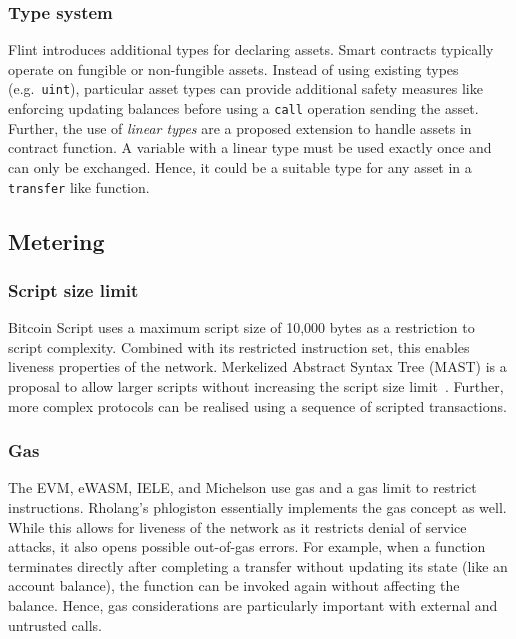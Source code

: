 \subsubsection{Type system}
Flint introduces additional types for declaring assets. Smart contracts typically operate on fungible or non-fungible assets. Instead of using existing types (e.g.\ \texttt{uint}), particular asset types can provide additional safety measures like enforcing updating balances before using a \texttt{call} operation sending the asset.
Further, the use of \emph{linear types} are a proposed extension to handle assets in contract function.
A variable with a linear type must be used exactly once and can only be exchanged.
Hence, it could be a suitable type for any asset in a \texttt{transfer} like function.



\subsection{Metering}

\subsubsection{Script size limit}
Bitcoin Script uses a maximum script size of 10,000 bytes as a restriction to script complexity. 
Combined with its restricted instruction set, this enables liveness properties of the network. 
Merkelized Abstract Syntax Tree (MAST) is a proposal to allow larger scripts without increasing the script size limit~\cite{Harding2017}.
Further, more complex protocols can be realised using a sequence of scripted transactions.

\subsubsection{Gas}
The EVM, eWASM, IELE, and Michelson use gas and a gas limit to restrict instructions. Rholang's phlogiston essentially implements the gas concept as well. While this allows for liveness of the network as it restricts denial of service attacks, it also opens possible out-of-gas errors. For example, when a function terminates directly after completing a transfer without updating its state (like an account balance), the function can be invoked again without affecting the balance.
Hence, gas considerations are particularly important with external and untrusted calls.


